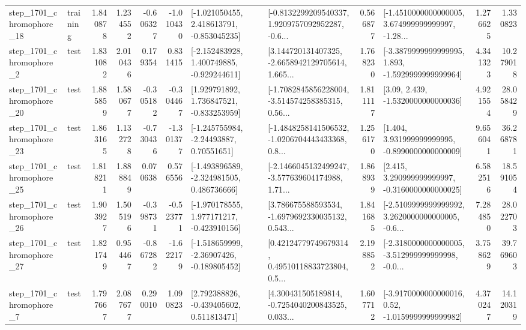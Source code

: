 \begin{tabular}{llrrrrllrlrr}
 step\_1701\_chromophore\_18 &  training &      1.840878 &    1.234552 &     -0.606327 & -1.010430 &   [-1.021050455, 2.418613791, -0.853045235] &  [-0.8132299209540337, 1.9209757092952287, -0.6... &       0.566877 &  [-1.4510000000000005, 3.674999999999997, -1.28... &            1.276625 &          1.330823 \\
  step\_1701\_chromophore\_2 &      test &      1.831082 &    2.010436 &      0.179354 &  0.831415 &   [-2.152483928, 1.400749885, -0.929244611] &  [3.144720131407325, -2.6658942129705614, 1.665... &       1.768230 &  [-3.3879999999999995, 1.893, -1.5929999999999964] &            4.341323 &         10.279018 \\
 step\_1701\_chromophore\_20 &      test &      1.885859 &    1.580677 &     -0.305182 & -0.304467 &    [1.929791892, 1.736847521, -0.833253959] &  [-1.7082845856228004, -3.514574258385315, 0.56... &       1.811117 &                 [3.09, 2.439, -1.5320000000000036] &            4.921554 &         28.058429 \\
 step\_1701\_chromophore\_23 &      test &      1.863165 &    1.132728 &     -0.730436 & -1.301377 &     [-1.245755984, -2.24493887, 0.70551651] &  [-1.4848258141506532, -1.0206704443433368, 0.8... &       1.256170 &    [1.404, 3.931999999999995, -0.8990000000000009] &            9.656041 &         36.268781 \\
 step\_1701\_chromophore\_25 &      test &      1.818211 &    1.888849 &      0.070638 &  0.576556 &   [-1.493896589, -2.324981505, 0.486736666] &  [-2.1466045132499247, -3.577639604174988, 1.71... &       1.868939 &    [2.415, 3.290999999999997, -0.3160000000000025] &            6.582516 &         18.591054 \\
 step\_1701\_chromophore\_26 &      test &      1.903927 &    1.505196 &     -0.398731 & -0.523771 &   [-1.970178555, 1.977171217, -0.423910156] &  [3.786675588593534, -1.6979692330035132, 0.543... &       1.841685 &  [-2.5109999999999992, 3.2620000000000005, -0.6... &            7.284850 &         28.022703 \\
 step\_1701\_chromophore\_27 &      test &      1.821749 &    0.954467 &     -0.867282 & -1.622179 &   [-1.518659999, -2.36907426, -0.189805452] &  [0.42124779749679314, 0.49510118833723804, 0.5... &       2.198852 &  [-2.3180000000000005, -3.512999999999998, -0.0... &            3.758629 &         39.769603 \\
  step\_1701\_chromophore\_7 &      test &      1.797667 &    2.087677 &      0.290010 &  1.090823 &    [2.792388826, -0.439405602, 0.511813471] &  [4.300431505189814, -0.7254040200843525, 0.033... &       1.607712 &   [-3.9170000000000016, 0.52, -1.0159999999999982] &            4.370247 &         14.120319 \\

\end{tabular}
